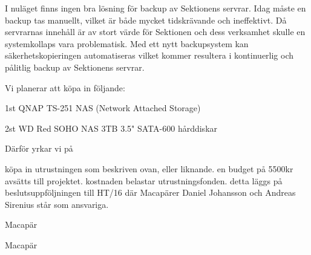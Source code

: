 \documentclass[../_main/handlingar.tex]{subfiles}
\begin{document}

I nuläget finns ingen bra lösning för backup av Sektionens servrar. Idag måste en backup tas manuellt, vilket är både mycket tidskrävande och ineffektivt. Då servrarnas innehåll är av stort värde för Sektionen och dess verksamhet skulle en systemkollaps vara problematisk. Med ett nytt backupsystem kan säkerhetskopieringen automatiseras vilket kommer resultera i kontinuerlig och pålitlig backup av Sektionens servrar.

Vi planerar att köpa in följande:
\begin{dashlist}
    \item 1st QNAP TS-251 NAS (Network Attached Storage)
    \item 2st WD Red SOHO NAS 3TB 3.5" SATA-600 hårddiskar
\end{dashlist}

Därför yrkar vi på
\begin{attsatser}
    \att köpa in utrustningen som beskriven ovan, eller liknande.
    \att en budget på 5500kr avsätts till projektet.
    \att kostnaden belastar utrustningsfonden.
    \att detta läggs på beslutsuppföljningen till HT/16 där Macapärer Daniel Johansson och Andreas Sirenius står som ansvariga.
\end{attsatser}

\begin{signatures}{2}
    \mvh
    \signature{Daniel Johansson}{Macapär}
    \signature{Andreas Sirenius}{Macapär}
\end{signatures}
\end{document}
